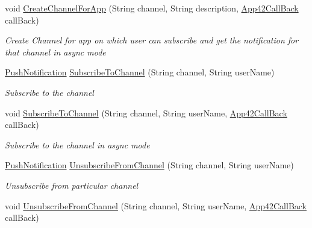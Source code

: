 \begin{DoxyCompactItemize}
void \hyperlink{classcom_1_1shephertz_1_1app42_1_1paas_1_1sdk_1_1csharp_1_1push_notification_1_1_push_notification_service_ae29ebbc598fa0d5625478256876ed358}{Create\+Channel\+For\+App} (String channel, String description, \hyperlink{interfacecom_1_1shephertz_1_1app42_1_1paas_1_1sdk_1_1csharp_1_1_app42_call_back}{App42\+Call\+Back} call\+Back)
\begin{DoxyCompactList}\small\item\em Create Channel for app on which user can subscribe and get the notification for that channel in async mode \end{DoxyCompactList}\item 
\hyperlink{classcom_1_1shephertz_1_1app42_1_1paas_1_1sdk_1_1csharp_1_1push_notification_1_1_push_notification}{Push\+Notification} \hyperlink{classcom_1_1shephertz_1_1app42_1_1paas_1_1sdk_1_1csharp_1_1push_notification_1_1_push_notification_service_a83aa74a46ec76ed4d5e4f0758735c737}{Subscribe\+To\+Channel} (String channel, String user\+Name)
\begin{DoxyCompactList}\small\item\em Subscribe to the channel \end{DoxyCompactList}\item 
void \hyperlink{classcom_1_1shephertz_1_1app42_1_1paas_1_1sdk_1_1csharp_1_1push_notification_1_1_push_notification_service_a0b0567504d3eb05435dd9f0b0041e9f9}{Subscribe\+To\+Channel} (String channel, String user\+Name, \hyperlink{interfacecom_1_1shephertz_1_1app42_1_1paas_1_1sdk_1_1csharp_1_1_app42_call_back}{App42\+Call\+Back} call\+Back)
\begin{DoxyCompactList}\small\item\em Subscribe to the channel in async mode \end{DoxyCompactList}\item 
\hyperlink{classcom_1_1shephertz_1_1app42_1_1paas_1_1sdk_1_1csharp_1_1push_notification_1_1_push_notification}{Push\+Notification} \hyperlink{classcom_1_1shephertz_1_1app42_1_1paas_1_1sdk_1_1csharp_1_1push_notification_1_1_push_notification_service_acad01bd18ed5119130c7fd6dccd7c984}{Unsubscribe\+From\+Channel} (String channel, String user\+Name)
\begin{DoxyCompactList}\small\item\em Unsubscribe from particular channel \end{DoxyCompactList}\item 
void \hyperlink{classcom_1_1shephertz_1_1app42_1_1paas_1_1sdk_1_1csharp_1_1push_notification_1_1_push_notification_service_af6d4dadcc3764ea538f7325d5b5bb9bb}{Unsubscribe\+From\+Channel} (String channel, String user\+Name, \hyperlink{interfacecom_1_1shephertz_1_1app42_1_1paas_1_1sdk_1_1csharp_1_1_app42_call_back}{App42\+Call\+Back} call\+Back)

\end{DoxyCompactItemize}
